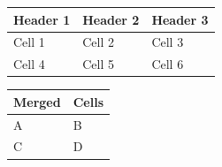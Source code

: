 \documentclass{article}
\begin{document}
\begin{table}[h]
\centering
\begin{tabular}{lll}
\toprule
Header 1 & Header 2 & Header 3 \\
\midrule
Cell 1 & Cell 2 & Cell 3 \\
Cell 4 & Cell 5 & Cell 6 \\
\bottomrule
\end{tabular}
\end{table}

\begin{table}[h]
\centering
\begin{tabular}{ll}
\toprule
Merged & Cells \\
\midrule
A & B \\
C & D \\
\bottomrule
\end{tabular}
\end{table}
\end{document}
